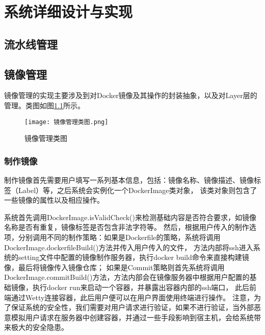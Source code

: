 
\chapter{系统详细设计与实现}

\section{流水线管理}

\section{镜像管理}
镜像管理的实现主要涉及到对Docker镜像及其操作的封装抽象，以及对Layer层的管理。类图如图\ref{fig:镜像管理类图}所示。

\begin{figure}[h]
  \centering
  \texttt{[image: 镜像管理类图.png]}
  \caption{镜像管理类图}
  \label{fig:镜像管理类图}
\end{figure}

\subsection{制作镜像}
制作镜像首先需要用户填写一系列基本信息，包括：镜像名称、镜像描述、镜像标签（Label）等，之后系统会实例化一个DockerImage类对象，
该类对象则包含了一些镜像的属性以及相应操作。

系统首先调用DockerImage.isValidCheck()来检测基础内容是否符合要求，如镜像名称是否有重复，镜像标签是否包含非法字符等。
然后，根据用户传入的制作选项，分别调用不同的制作策略：如果是Dockerfile的策略，系统将调用DockerImage.dockerfileBuild()方法并传入用户传入的文件，
方法内部将ssh进入系统的setting文件中配置的镜像制作服务器，执行docker build命令来直接构建镜像，最后将镜像传入镜像仓库；
如果是Commit策略则首先系统将调用DockerImage.commitBuild()方法，方法内部会在镜像服务器中根据用户配置的基础镜像，执行docker run来启动一个容器，并暴露出容器内部的ssh端口，
此后前端通过Wetty连接容器，此后用户便可以在用户界面使用终端进行操作。
注意，为了保证系统的安全性，我们需要对用户请求进行验证，如果不进行验证，当外部恶意模拟用户请求在服务器中创建容器，并通过一些手段影响到宿主机，会给系统带来极大的安全隐患。

